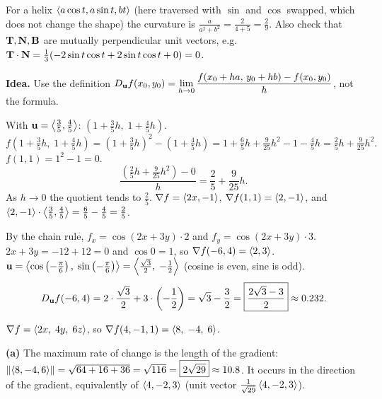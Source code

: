 
\begin{altmethod}
For a helix $\left\langle a\cos t,a\sin t,bt \right\rangle$ (here traversed with $\sin$ and $\cos$ swapped,
which does not change the shape) the curvature is $\frac{a}{a^2+b^2}=\frac{2}{4+5}=\frac29$.
Also check that $\mathbf{T},\mathbf{N},\mathbf{B}$ are mutually perpendicular unit vectors, e.g.
$\mathbf{T}\cdot\mathbf{N}=\frac13(-2\sin t\cos t+2\sin t\cos t+0)=0$.
\end{altmethod}

\textbf{Idea.} Use the definition
$D_{\mathbf{u}} f(x_0,y_0)=\displaystyle\lim_{h\to0}\frac{f(x_0+ha,\,y_0+hb)-f(x_0,y_0)}{h}$, not the formula.

 With $\mathbf{u}=\left\langle \frac35,\frac45 \right\rangle$: $\left(1+\frac35h,\;1+\frac45h\right)$.
\[
  f\!\left(1+\tfrac35h,\;1+\tfrac45h\right)=\left(1+\tfrac35h\right)^2-\left(1+\tfrac45h\right)
  =1+\tfrac65h+\tfrac{9}{25}h^2-1-\tfrac45h=\tfrac25h+\tfrac{9}{25}h^2 .
\]
 $f(1,1)=1^2-1=0$.
\[
  \frac{\left(\frac25h+\frac{9}{25}h^2\right)-0}{h}=\frac25+\frac{9}{25}h .
\]
 As $h\to0$ the quotient tends to $\boxed{\frac25}$.
 $\nabla f=\left\langle 2x,-1 \right\rangle$, $\nabla f(1,1)=\left\langle 2,-1 \right\rangle$, and
$\left\langle 2,-1 \right\rangle\cdot\left\langle \frac35,\frac45 \right\rangle=\frac65-\frac45=\frac25$.\checkok

 By the chain rule, $f_x=\cos(2x+3y)\cdot2$ and $f_y=\cos(2x+3y)\cdot3$.
 $2x+3y=-12+12=0$ and $\cos0=1$, so $\nabla f(-6,4)=\left\langle 2,3 \right\rangle$.
 $\mathbf{u}=\left\langle \cos\left(-\frac\pi6\right),\;\sin\left(-\frac\pi6\right) \right\rangle=\left\langle \frac{\sqrt3}{2},\;-\frac12 \right\rangle$
(cosine is even, sine is odd).
\[
  D_{\mathbf{u}} f(-6,4)=2\cdot\frac{\sqrt3}{2}+3\cdot\left(-\frac12\right)=\sqrt3-\frac32=\boxed{\frac{2\sqrt3-3}{2}}\approx0.232 .
\]

 $\nabla f=\left\langle 2x,\;4y,\;6z \right\rangle$, so $\nabla f(4,-1,1)=\left\langle 8,\;-4,\;6 \right\rangle$.

\textbf{(a)} The maximum rate of change is the length of the gradient:
$\lVert\left\langle 8,-4,6 \right\rangle\rVert=\sqrt{64+16+36}=\sqrt{116}=\boxed{2\sqrt{29}}\approx10.8$. It occurs in the
direction of the gradient, equivalently of $\left\langle 4,-2,3 \right\rangle$ (unit vector $\frac{1}{\sqrt{29}}\left\langle 4,-2,3 \right\rangle$).

